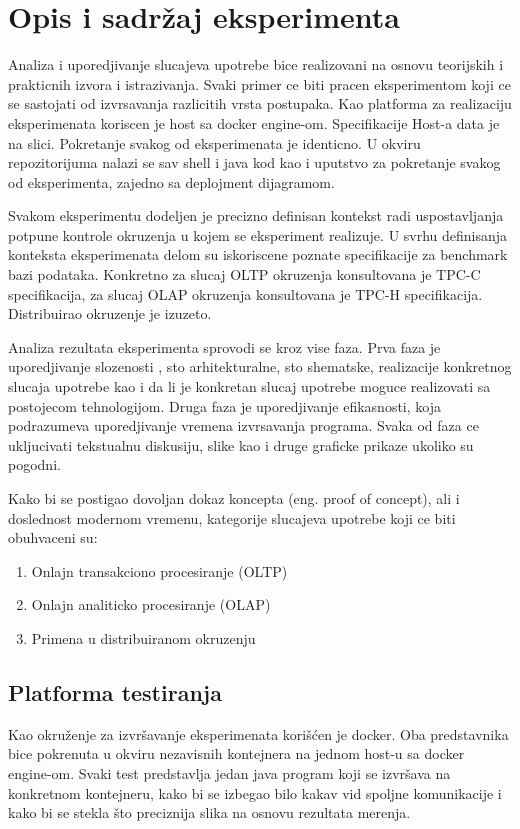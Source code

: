 \documentclass[12pt,oneside]{memoir}
\begin{document}
\section{Opis i sadržaj eksperimenta}
Analiza i uporedjivanje slucajeva upotrebe bice realizovani na osnovu teorijskih i prakticnih  izvora i istrazivanja. Svaki primer ce biti pracen eksperimentom koji ce se sastojati od izvrsavanja razlicitih vrsta postupaka. Kao platforma za realizaciju eksperimenata koriscen je host sa docker engine-om. Specifikacije Host-a data je na slici. Pokretanje svakog od eksperimenata je identicno. U okviru repozitorijuma nalazi se sav shell i java kod kao i uputstvo za pokretanje svakog od eksperimenta, zajedno sa deplojment dijagramom.

Svakom eksperimentu dodeljen je precizno definisan kontekst radi uspostavljanja potpune kontrole okruzenja u kojem se eksperiment realizuje. U svrhu definisanja konteksta eksperimenata delom su iskoriscene poznate specifikacije za benchmark bazi podataka. Konkretno za slucaj OLTP okruzenja konsultovana je TPC-C specifikacija, za slucaj OLAP okruzenja konsultovana je TPC-H specifikacija. Distribuirao okruzenje je izuzeto.

Analiza rezultata eksperimenta sprovodi se kroz vise faza. Prva faza je uporedjivanje slozenosti , sto arhitekturalne, sto shematske, realizacije konkretnog slucaja upotrebe kao i da li je konkretan slucaj upotrebe moguce realizovati sa postojecom tehnologijom. Druga faza je uporedjivanje efikasnosti, koja podrazumeva uporedjivanje vremena izvrsavanja programa.  Svaka od faza ce ukljucivati tekstualnu diskusiju, slike kao i druge graficke prikaze ukoliko su pogodni.

Kako bi se postigao dovoljan dokaz koncepta (eng. proof of concept), ali i doslednost modernom
vremenu, kategorije slucajeva upotrebe koji ce biti obuhvaceni su:
\begin{enumerate}
\item Onlajn transakciono procesiranje (OLTP)
\item Onlajn analiticko procesiranje (OLAP)
\item Primena u distribuiranom okruzenju
\end{enumerate}

\subsection{Platforma testiranja}

Kao okruženje za izvršavanje eksperimenata korišćen je docker.  Oba predstavnika bice pokrenuta u okviru nezavisnih kontejnera na jednom host-u sa docker engine-om. Svaki test predstavlja jedan java program koji se izvršava na konkretnom kontejneru, kako bi se izbegao bilo kakav vid spoljne komunikacije i kako bi se stekla što preciznija slika na osnovu rezultata merenja.  
\end{document}
